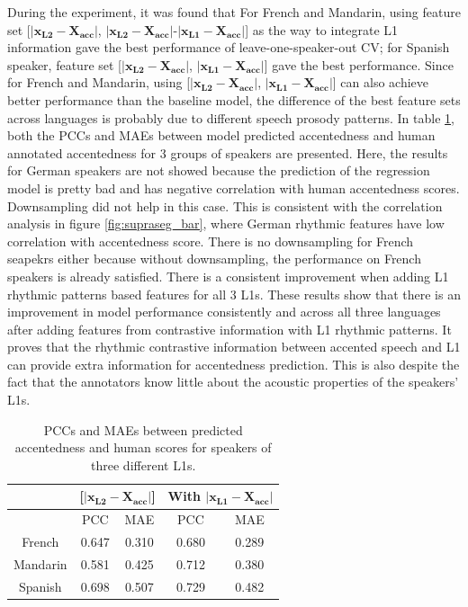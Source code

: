 During the experiment, it was found that For French and Mandarin, using feature set [$\left| \mathbf{x_{L2}}-\mathbf{X_{acc}} \right|$, $\left| \mathbf{x_{L2}}-\mathbf{X_{acc}} \right|$-$\left| \mathbf{x_{L1}}- \mathbf{X_{acc}} \right|$] as the way to integrate L1 information gave the best performance of leave-one-speaker-out CV; for Spanish speaker, feature set [$\left| \mathbf{x_{L2}}-\mathbf{X_{acc}} \right|$, $\left| \mathbf{x_{L1}}- \mathbf{X_{acc}} \right|$] gave the best performance. Since for French and Mandarin, using [$\left| \mathbf{x_{L2}}-\mathbf{X_{acc}} \right|$, $\left| \mathbf{x_{L1}}- \mathbf{X_{acc}} \right|$] can also achieve better performance than the baseline model, the difference of the best feature sets across languages is probably due to different speech prosody patterns.
In table \ref{table:supraseg_pred}, both the PCCs and MAEs between model predicted accentedness and human annotated accentedness for 3 groups of speakers are presented. Here, the results for German speakers are not showed because the prediction of the regression model is pretty bad and has negative correlation with human accentedness scores. Downsampling did not help in this case. This is consistent with the correlation analysis in figure \ref{fig:supraseg_bar}, where German rhythmic features have low correlation with accentedness score. There is no downsampling for French seapekrs either because without downsampling, the performance on French speakers is already satisfied. There is a consistent improvement when adding L1 rhythmic patterns based features for all 3 L1s. These results show that there is an improvement in model performance consistently and across all three languages after adding features from contrastive information with L1 rhythmic patterns. It proves that the rhythmic contrastive information between accented speech and L1 can provide extra information for accentedness prediction. This is also despite the fact that the annotators know little about the acoustic properties of the speakers' L1s.

\begin{table}[]
\centering
\caption{PCCs and MAEs between predicted accentedness and human scores for speakers of three different L1s.}
\label{table:supraseg_pred}
\begin{tabular}{|c|c|c|c|c|}
\hline
 & \multicolumn{2}{c|}{[$\left| \mathbf{x_{L2}}-\mathbf{X_{acc}} \right|$]} & \multicolumn{2}{c|}{With $\left| \mathbf{x_{L1}}- \mathbf{X_{acc}} \right|$} \\ \hline
 & PCC & MAE & PCC & MAE \\ \hline
French & 0.647 & 0.310 & 0.680 & 0.289 \\ \hline
Mandarin & 0.581 & 0.425 & 0.712 & 0.380 \\ \hline
Spanish & 0.698 & 0.507 & 0.729 & 0.482 \\ \hline
\end{tabular}
\end{table}

